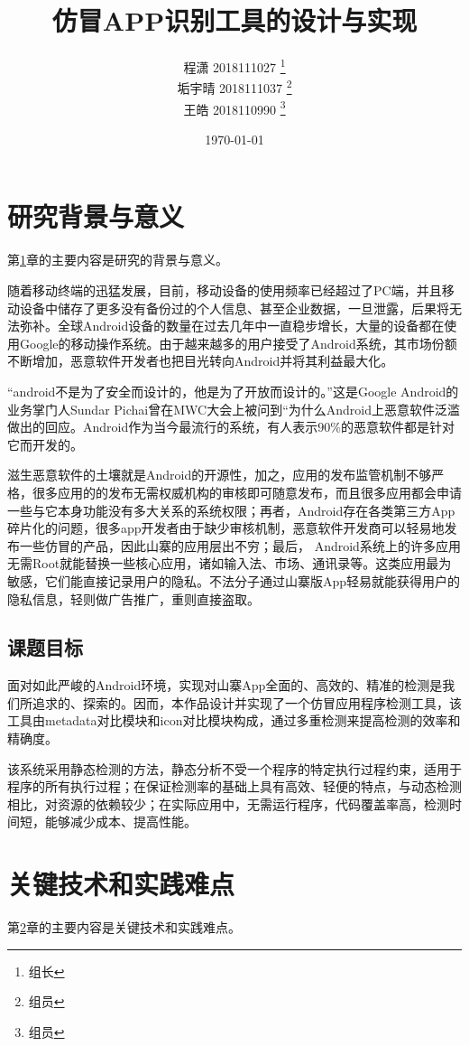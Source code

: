 \documentclass[UTF8,a4paper,10pt, twocolumn]{ctexart}
\title{仿冒APP识别工具的设计与实现}
\author{ 程潇 2018111027  \thanks{组长}\\
垢宇晴 2018111037  \thanks{组员}\\
王皓 2018110990  \thanks{组员}
}
\date{\today}
\begin{document}
    \maketitle
    \thispagestyle{fancy}

\section{研究背景与意义} \label{sec:one}
第\ref{sec:one}章的主要内容是研究的背景与意义。

随着移动终端的迅猛发展，目前，移动设备的使用频率已经超过了PC端，并且移动设备中储存了更多没有备份过的个人信息、甚至企业数据，一旦泄露，后果将无法弥补。全球Android设备的数量在过去几年中一直稳步增长，大量的设备都在使用Google的移动操作系统。由于越来越多的用户接受了Android系统，其市场份额不断增加，恶意软件开发者也把目光转向Android并将其利益最大化。

“android不是为了安全而设计的，他是为了开放而设计的。”这是Google Android的业务掌门人Sundar Pichai曾在MWC大会上被问到“为什么Android上恶意软件泛滥做出的回应。Android作为当今最流行的系统，有人表示$90\%$的恶意软件都是针对它而开发的。

滋生恶意软件的土壤就是Android的开源性，加之，应用的发布监管机制不够严格，很多应用的的发布无需权威机构的审核即可随意发布，而且很多应用都会申请一些与它本身功能没有多大关系的系统权限；再者，Android存在各类第三方App碎片化的问题，很多app开发者由于缺少审核机制，恶意软件开发商可以轻易地发布一些仿冒的产品，因此山寨的应用层出不穷；最后， Android系统上的许多应用无需Root就能替换一些核心应用，诸如输入法、市场、通讯录等。这类应用最为敏感，它们能直接记录用户的隐私。不法分子通过山寨版App轻易就能获得用户的隐私信息，轻则做广告推广，重则直接盗取。

\subsection{课题目标}
面对如此严峻的Android环境，实现对山寨App全面的、高效的、精准的检测是我们所追求的、探索的。因而，本作品设计并实现了一个仿冒应用程序检测工具，该工具由metadata对比模块和icon对比模块构成，通过多重检测来提高检测的效率和精确度。

该系统采用静态检测的方法，静态分析不受一个程序的特定执行过程约束，适用于程序的所有执行过程；在保证检测率的基础上具有高效、轻便的特点，与动态检测相比，对资源的依赖较少；在实际应用中，无需运行程序，代码覆盖率高，检测时间短，能够减少成本、提高性能。

\section{关键技术和实践难点} \label{sec:two}
   第\ref{sec:two}章的主要内容是关键技术和实践难点。
\end{document}
